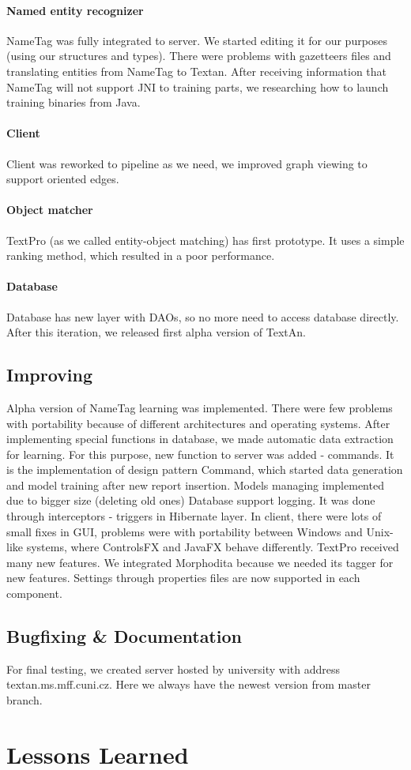 \paragraph{Named entity recognizer} NameTag was fully integrated to server. We 
started editing it for our purposes (using our structures and types). There were
problems with gazetteers files and translating entities from NameTag to Textan.
After receiving information that NameTag will not support JNI to training parts,
 we researching how to launch training binaries from Java.
\paragraph{Client} Client was reworked to pipeline as we need, we improved graph
 viewing to support oriented edges.
\paragraph{Object matcher} TextPro (as we called entity-object matching) has first
 prototype. It uses a simple ranking method, which resulted in a poor performance. 
\paragraph{Database} Database has new layer with DAOs, so no more need to access
database directly. After this iteration, we released first alpha version of TextAn.

\subsection{Improving}
Alpha version of NameTag learning was implemented. There were few problems with
portability because of different architectures and operating systems. After
implementing special functions in database, we made automatic data extraction for
learning. For this purpose, new function to server was added - commands. It is
the implementation of design pattern Command, which started data generation and
model training after new report insertion. Models managing implemented due to
bigger size (deleting old ones) Database support logging. It was done through
interceptors - triggers in Hibernate layer. In client, there were lots of small
fixes in GUI, problems were with portability between Windows and Unix-like systems,
where ControlsFX and JavaFX behave differently. TextPro received many new features.
We integrated Morphodita because we needed its tagger for new features.
Settings through properties files are now supported in each component.

\subsection{Bugfixing \& Documentation}
For final testing, we created server hosted by university with address textan.ms.mff.cuni.cz.
Here we always have the newest version from master branch.

\section{Lessons Learned}
